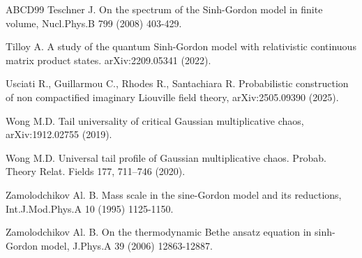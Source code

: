\documentclass[11pt]{article}
\numberwithin{equation}{section}
\theoremstyle{definition}
\begin{document}
\begin{thebibliography}{ABCD99}
 Teschner J. On the spectrum of the Sinh-Gordon model in finite volume, Nucl.Phys.B 799 (2008) 403-429.

 Tilloy A. A study of the quantum Sinh-Gordon model with relativistic continuous matrix product states. arXiv:2209.05341 (2022).

 Usciati R., Guillarmou C., Rhodes R., Santachiara R. Probabilistic construction of non compactified imaginary Liouville field theory, arXiv:2505.09390 (2025).

 Wong M.D. Tail universality of critical Gaussian multiplicative chaos, arXiv:1912.02755 (2019).

 Wong M.D. Universal tail profile of Gaussian multiplicative chaos. Probab. Theory Relat. Fields 177, 711–746 (2020).


 Zamolodchikov Al. B. Mass scale in the sine-Gordon model and its reductions, Int.J.Mod.Phys.A 10 (1995) 1125-1150.

 Zamolodchikov Al. B. On the thermodynamic Bethe ansatz equation in sinh-Gordon model, J.Phys.A 39 (2006) 12863-12887.


\end{thebibliography}
\end{document}
